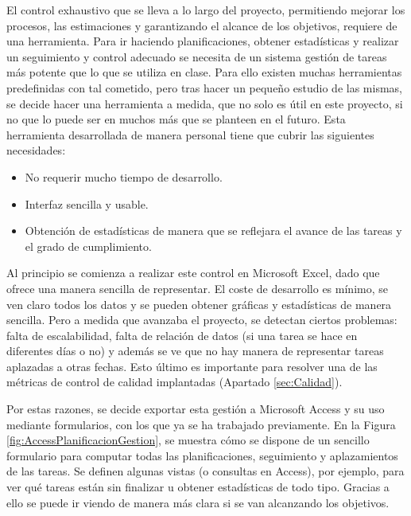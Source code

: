 El control exhaustivo que se lleva a lo largo del proyecto, permitiendo mejorar los procesos, las estimaciones y garantizando el alcance de los objetivos, requiere de una herramienta. Para ir haciendo planificaciones, obtener estadísticas y realizar un seguimiento y control adecuado se necesita de un sistema gestión de tareas más potente que lo que se utiliza en clase. Para ello existen muchas herramientas predefinidas con tal cometido, pero tras hacer un pequeño estudio de las mismas, se decide hacer una herramienta a medida, que no solo es útil en este proyecto, si no que lo puede ser en muchos más que se planteen en el futuro. Esta herramienta desarrollada de manera personal tiene que cubrir las siguientes necesidades:
\begin{itemize}
\item{No requerir mucho tiempo de desarrollo.}
\item{Interfaz sencilla y usable.}
\item{Obtención de estadísticas de manera que se reflejara el avance de las tareas y el grado de cumplimiento.}
\end{itemize}

Al principio se comienza a realizar este control en Microsoft Excel, dado que ofrece una manera sencilla de representar. El coste de desarrollo es mínimo, se ven claro todos los datos y se pueden obtener gráficas y estadísticas de manera sencilla. Pero a medida que avanzaba el proyecto, se detectan ciertos problemas: falta de escalabilidad, falta de relación de datos (si una tarea se hace en diferentes días o no) y además se ve que no hay manera de representar tareas aplazadas a otras fechas. Esto último es importante para resolver una de las métricas de control de calidad implantadas (Apartado \ref{sec:Calidad}).

Por estas razones, se decide exportar esta gestión a Microsoft Access y su uso mediante formularios, con los que ya se ha trabajado previamente. En la Figura \ref{fig:AccessPlanificacionGestion}, se muestra cómo se dispone de un sencillo formulario para computar todas las planificaciones, seguimiento y aplazamientos de las tareas. Se definen algunas vistas (o consultas en Access), por ejemplo, para ver qué tareas están sin finalizar u obtener estadísticas de todo tipo. Gracias a ello se puede ir viendo de manera más clara si se van alcanzando los objetivos.

